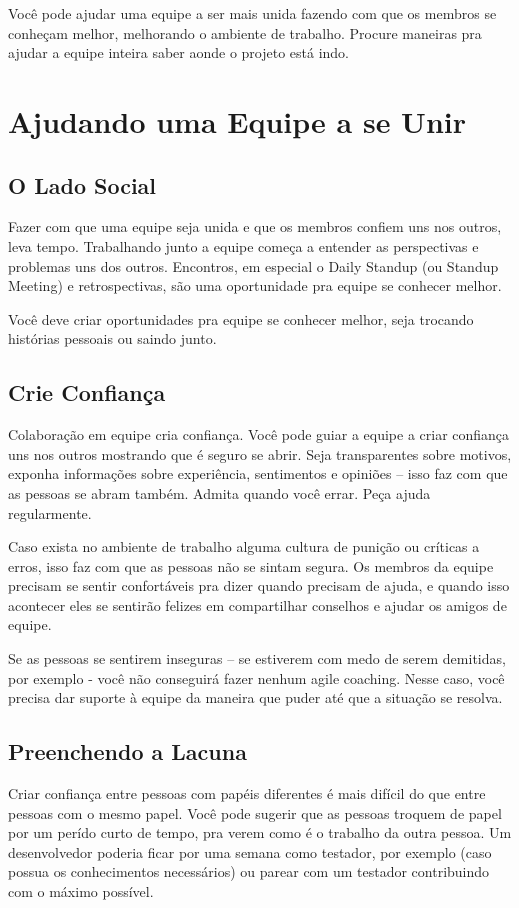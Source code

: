 \documentclass[a4paper, 10pt, font=plain]{abnt}
\begin{document}
Você pode ajudar uma equipe a ser mais unida fazendo com que os membros se conheçam melhor, melhorando o ambiente de trabalho. Procure maneiras pra ajudar a equipe inteira saber aonde o projeto está indo.

\section{Ajudando uma Equipe a se Unir}

\subsection{O Lado Social}
Fazer com que uma equipe seja unida e que os membros confiem uns nos outros, leva tempo. Trabalhando junto a equipe começa a entender as perspectivas e problemas uns dos outros. Encontros, em especial o Daily Standup (ou Standup Meeting) e retrospectivas, são uma oportunidade pra equipe se conhecer melhor.

Você deve criar oportunidades pra equipe se conhecer melhor, seja trocando histórias pessoais ou saindo junto.

\subsection{Crie Confiança}
Colaboração em equipe cria confiança. Você pode guiar a equipe a criar confiança uns nos outros mostrando que é seguro se abrir. Seja transparentes sobre motivos, exponha informações sobre experiência, sentimentos e opiniões -- isso faz com que as pessoas se abram também. Admita quando você errar. Peça ajuda regularmente.

Caso exista no ambiente de trabalho alguma cultura de punição ou críticas a erros, isso faz com que as pessoas não se sintam segura. Os membros da equipe precisam se sentir confortáveis pra dizer quando precisam de ajuda, e quando isso acontecer eles se sentirão felizes em compartilhar conselhos e ajudar os amigos de equipe.

Se as pessoas se sentirem inseguras -- se estiverem com medo de serem demitidas, por exemplo - você não conseguirá fazer nenhum agile coaching. Nesse caso, você precisa dar suporte à equipe da maneira que puder até que a situação se resolva.


\subsection{Preenchendo a Lacuna}
Criar confiança entre pessoas com papéis diferentes é mais difícil do que entre pessoas com o mesmo papel. Você pode sugerir que as pessoas troquem de papel por um perído curto de tempo, pra verem como é o trabalho da outra pessoa. Um desenvolvedor poderia ficar por uma semana como testador, por exemplo (caso possua os conhecimentos necessários) ou parear com um testador contribuindo com o máximo possível.
\end{document}
